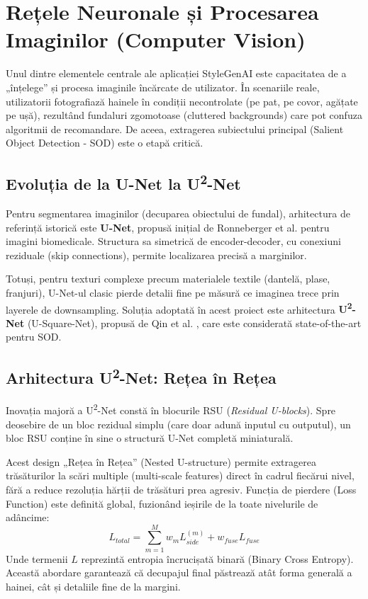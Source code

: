 \section{Rețele Neuronale și Procesarea Imaginilor (Computer Vision)}

Unul dintre elementele centrale ale aplicației StyleGenAI este capacitatea de a „înțelege” și procesa imaginile încărcate de utilizator. În scenariile reale, utilizatorii fotografiază hainele în condiții necontrolate (pe pat, pe covor, agățate pe ușă), rezultând fundaluri zgomotoase (cluttered backgrounds) care pot confuza algoritmii de recomandare. De aceea, extragerea subiectului principal (Salient Object Detection - SOD) este o etapă critică.

\subsection{Evoluția de la U-Net la U\textsuperscript{2}-Net}
Pentru segmentarea imaginilor (decuparea obiectului de fundal), arhitectura de referință istorică este \textbf{U-Net}, propusă inițial de Ronneberger et al. \cite{ronneberger2015unet} pentru imagini biomedicale. Structura sa simetrică de encoder-decoder, cu conexiuni reziduale (skip connections), permite localizarea precisă a marginilor.

Totuși, pentru texturi complexe precum materialele textile (dantelă, plase, franjuri), U-Net-ul clasic pierde detalii fine pe măsură ce imaginea trece prin layerele de downsampling.
Soluția adoptată în acest proiect este arhitectura \textbf{U\textsuperscript{2}-Net} (U-Square-Net), propusă de Qin et al. \cite{qin2020u2net}, care este considerată state-of-the-art pentru SOD.

\subsection{Arhitectura U\textsuperscript{2}-Net: Rețea în Rețea}
Inovația majoră a U\textsuperscript{2}-Net constă în blocurile RSU (\textit{Residual U-blocks}). Spre deosebire de un bloc rezidual simplu (care doar adună inputul cu outputul), un bloc RSU conține în sine o structură U-Net completă miniaturală.

Acest design „Rețea în Rețea” (Nested U-structure) permite extragerea trăsăturilor la scări multiple (multi-scale features) direct în cadrul fiecărui nivel, fără a reduce rezoluția hărții de trăsături prea agresiv.
Funcția de pierdere (Loss Function) este definită global, fuzionând ieșirile de la toate nivelurile de adâncime:
\begin{equation}
L_{total} = \sum_{m=1}^{M} w_m L_{side}^{(m)} + w_{fuse} L_{fuse}
\end{equation}
Unde termenii $L$ reprezintă entropia încrucișată binară (Binary Cross Entropy). Această abordare garantează că decupajul final păstrează atât forma generală a hainei, cât și detaliile fine de la margini.

